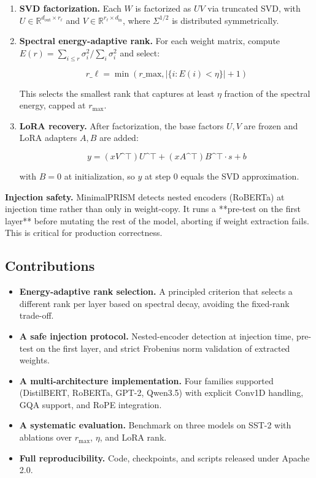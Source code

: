 \begin{enumerate}
\item \textbf{SVD factorization.} Each $W$ is factorized as $U V$ via truncated SVD,
  with $U \in \mathbb{R}^{d_\text{out} \times r_\ell}$ and
  $V \in \mathbb{R}^{r_\ell \times d_\text{in}}$, where $\Sigma^{1/2}$ is
  distributed symmetrically.

\item \textbf{Spectral energy-adaptive rank.} For each weight matrix, compute
  $E(r) = \sum_{i \leq r} \sigma_i^2 / \sum_i \sigma_i^2$ and select:

  $$
  r\_\ell = \min\!\left(r\_\text{max}, \left|\{i : E(i) < \eta\}\right| + 1\right)
  \tag{1.4}
  $$

  This selects the smallest rank that captures at least $\eta$ fraction of
  the spectral energy, capped at $r_\text{max}$.

\item \textbf{LoRA recovery.} After factorization, the base factors $U, V$ are
  frozen and LoRA adapters $A, B$ are added:

  $$
  y = (x V\^{}\top) U\^{}\top + (x A\^{}\top) B\^{}\top \cdot s + b
  \tag{1.5}
  $$

  with $B = 0$ at initialization, so $y$ at step 0 equals the SVD
  approximation.

\end{enumerate}
\textbf{Injection safety.} MinimalPRISM detects nested encoders (RoBERTa) at 
injection time rather than only in weight-copy. It runs a **pre-test on the 
first layer** before mutating the rest of the model, aborting if weight 
extraction fails. This is critical for production correctness.

\subsection{Contributions}

\begin{itemize}
\item \textbf{Energy-adaptive rank selection.} A principled criterion that selects
  a different rank per layer based on spectral decay, avoiding the
  fixed-rank trade-off.
\item \textbf{A safe injection protocol.} Nested-encoder detection at injection time,
  pre-test on the first layer, and strict Frobenius norm validation of
  extracted weights.
\item \textbf{A multi-architecture implementation.} Four families supported
  (DistilBERT, RoBERTa, GPT-2, Qwen3.5) with explicit Conv1D handling, GQA
  support, and RoPE integration.
\item \textbf{A systematic evaluation.} Benchmark on three models on SST-2 with
  ablations over $r_\text{max}$, $\eta$, and LoRA rank.
\item \textbf{Full reproducibility.} Code, checkpoints, and scripts released under
  Apache 2.0.

\end{itemize}
